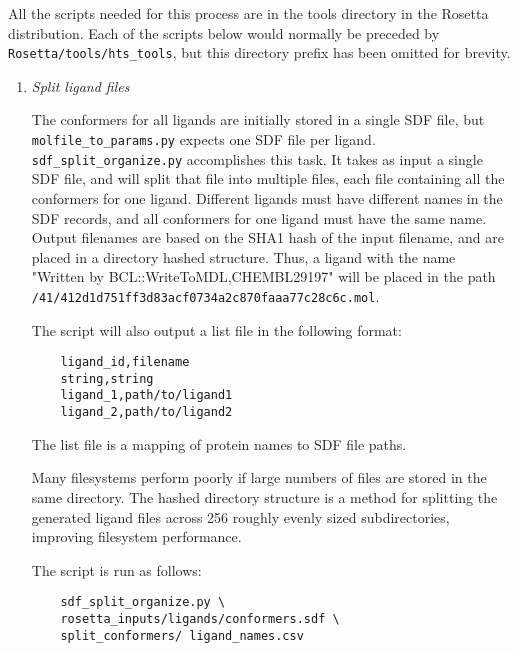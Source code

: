 All the scripts needed for this process are in the tools directory in the Rosetta distribution. 
Each of the scripts below would normally be preceded by\\
\texttt{Rosetta/tools/hts\_tools}, but this directory prefix has been omitted for brevity.

\begin{enumerate}
\def\labelenumi{\arabic{enumi}.}
\item
	\emph{Split ligand files}

	The conformers for all ligands are initially stored in a single \ac{SDF} file, but\\ \texttt{molfile\_to\_params.py} expects one \ac{SDF} file per ligand.\\
\texttt{sdf\_split\_organize.py} accomplishes this task. 
	It takes as input a single \ac{SDF} file, and will split that file into multiple files, each file containing all the conformers for one ligand.
	Different ligands must have different names in the \ac{SDF} records, and all conformers for one ligand must have the same name. 
	Output filenames are based on the SHA1 hash of the input filename, and are placed in a directory hashed structure.
	Thus, a ligand with the name "Written by BCL::WriteToMDL,CHEMBL29197" will be placed in the path\\
	 \texttt{/41/412d1d751ff3d83acf0734a2c870faaa77c28c6c.mol}.

	The script will also output a list file in the following format:
	
	\singlespace
	\begin{verbatim}
	ligand_id,filename
	string,string
	ligand_1,path/to/ligand1
	ligand_2,path/to/ligand2
	\end{verbatim}
	\doublespace

	The list file is a mapping of protein names to \ac{SDF} file paths.

	Many filesystems perform poorly if large numbers of files are stored in the same directory.
	The hashed directory structure is a method for splitting the generated ligand files across 256 roughly evenly sized subdirectories, improving filesystem performance.

	The script is run as follows:

	\singlespace
	\begin{verbatim}
	sdf_split_organize.py \
	rosetta_inputs/ligands/conformers.sdf \
	split_conformers/ ligand_names.csv
	\end{verbatim}
	\doublespace
	

\end{enumerate}
